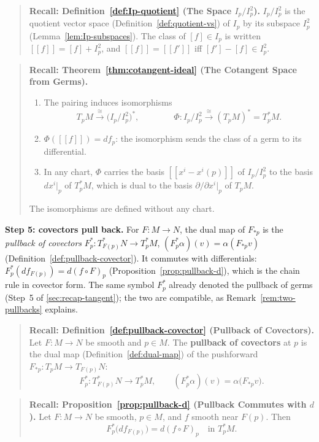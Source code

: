 \documentclass[11pt]{report}
\begin{document}
\begin{quote}
\textbf{Recall: Definition~\ref{def:Ip-quotient} (The Space $I_p/I_p^2$).} $I_p/I_p^2$ is the quotient vector space (Definition~\ref{def:quotient-vs}) of $I_p$ by its subspace $I_p^2$ (Lemma~\ref{lem:Ip-subspaces}). The class of $[f] \in I_p$ is written $[[f]] = [f] + I_p^2$, and $[[f]] = [[f']]$ iff $[f'] - [f] \in I_p^2$.
\end{quote}

\begin{quote}
\textbf{Recall: Theorem~\ref{thm:cotangent-ideal} (The Cotangent Space from Germs).} \begin{enumerate}
    \item The pairing induces isomorphisms
    \[
    T_pM \xrightarrow{\ \cong\ } \big(I_p/I_p^2\big)^*, \qquad\qquad \Phi : I_p/I_p^2 \xrightarrow{\ \cong\ } (T_pM)^* = T_p^*M .
    \]
    \item $\Phi([[f]]) = df_p$: the isomorphism sends the class of a germ to its differential.
    \item In any chart, $\Phi$ carries the basis $[[x^i - x^i(p)]]$ of $I_p/I_p^2$ to the basis $dx^i|_p$ of $T_p^*M$, which is dual to the basis $\partial/\partial x^i|_p$ of $T_pM$.
\end{enumerate}
The isomorphisms are defined without any chart.
\end{quote}

\textbf{Step 5: covectors pull back.} For $F : M \to N$, the dual map of $F_{*p}$ is the \emph{pullback of covectors} $F_p^* : T^*_{F(p)}N \to T_p^*M$, $(F_p^*\alpha)(v) = \alpha(F_{*p}v)$ (Definition~\ref{def:pullback-covector}). It commutes with differentials: $F_p^*(df_{F(p)}) = d(f \circ F)_p$ (Proposition~\ref{prop:pullback-d}), which is the chain rule in covector form. The same symbol $F_p^*$ already denoted the pullback of germs (Step~5 of \ref{sec:recap-tangent}); the two are compatible, as Remark~\ref{rem:two-pullbacks} explains.

\begin{quote}
\textbf{Recall: Definition~\ref{def:pullback-covector} (Pullback of Covectors).} Let $F : M \to N$ be smooth and $p \in M$. The \textbf{pullback of covectors} at $p$ is the dual map (Definition~\ref{def:dual-map}) of the pushforward $F_{*p} : T_pM \to T_{F(p)}N$:
\[
F_p^* : T^*_{F(p)}N \longrightarrow T_p^*M, \qquad (F_p^*\alpha)(v) = \alpha\big(F_{*p}v\big) .
\]
\end{quote}

\begin{quote}
\textbf{Recall: Proposition~\ref{prop:pullback-d} (Pullback Commutes with $d$).} Let $F : M \to N$ be smooth, $p \in M$, and $f$ smooth near $F(p)$. Then
\[
F_p^*\big(df_{F(p)}\big) = d(f \circ F)_p \quad \text{in } T_p^*M .
\]
\end{quote}
\end{document}
